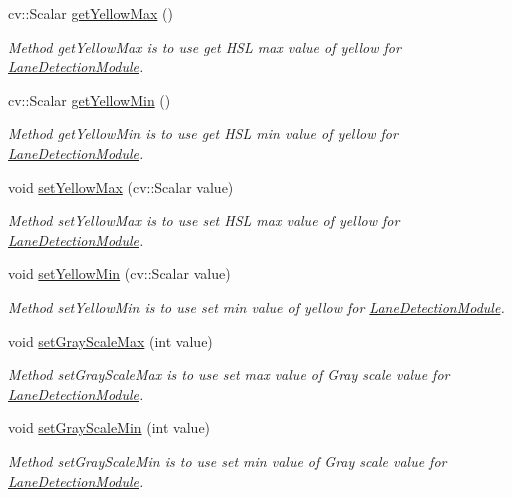 \begin{DoxyCompactItemize}
cv\+::\+Scalar \hyperlink{classLaneDetectionModule_a6623e87aa620c98c782c03392ce77def}{get\+Yellow\+Max} ()
\begin{DoxyCompactList}\small\item\em Method get\+Yellow\+Max is to use get H\+SL max value of yellow for \hyperlink{classLaneDetectionModule}{Lane\+Detection\+Module}. \end{DoxyCompactList}\item 
cv\+::\+Scalar \hyperlink{classLaneDetectionModule_a9b31a2a27534fdefbcfb2de841a893c2}{get\+Yellow\+Min} ()
\begin{DoxyCompactList}\small\item\em Method get\+Yellow\+Min is to use get H\+SL min value of yellow for \hyperlink{classLaneDetectionModule}{Lane\+Detection\+Module}. \end{DoxyCompactList}\item 
void \hyperlink{classLaneDetectionModule_a1f1d6d0bc111273b359db4ef289beef7}{set\+Yellow\+Max} (cv\+::\+Scalar value)
\begin{DoxyCompactList}\small\item\em Method set\+Yellow\+Max is to use set H\+SL max value of yellow for \hyperlink{classLaneDetectionModule}{Lane\+Detection\+Module}. \end{DoxyCompactList}\item 
void \hyperlink{classLaneDetectionModule_a6d6f42b5de704c711f0bdcf39173871b}{set\+Yellow\+Min} (cv\+::\+Scalar value)
\begin{DoxyCompactList}\small\item\em Method set\+Yellow\+Min is to use set min value of yellow for \hyperlink{classLaneDetectionModule}{Lane\+Detection\+Module}. \end{DoxyCompactList}\item 
void \hyperlink{classLaneDetectionModule_a36183171cc012f8444a995b718b22efc}{set\+Gray\+Scale\+Max} (int value)
\begin{DoxyCompactList}\small\item\em Method set\+Gray\+Scale\+Max is to use set max value of Gray scale value for \hyperlink{classLaneDetectionModule}{Lane\+Detection\+Module}. \end{DoxyCompactList}\item 
void \hyperlink{classLaneDetectionModule_a2aaaf00d3570b863502363a473f143c5}{set\+Gray\+Scale\+Min} (int value)
\begin{DoxyCompactList}\small\item\em Method set\+Gray\+Scale\+Min is to use set min value of Gray scale value for \hyperlink{classLaneDetectionModule}{Lane\+Detection\+Module}. \end{DoxyCompactList}\item 

\end{DoxyCompactItemize}
